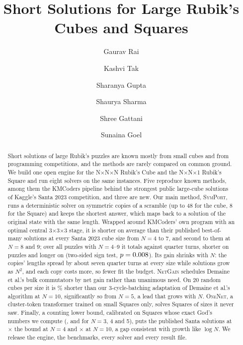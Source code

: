 \documentclass[sigconf,nonacm]{acmart}
\newcommand{\Sq}[1]{#1$\times$#1$\times$1\xspace}
\newcommand{\Cu}[1]{#1$\times$#1$\times$#1\xspace}
\newcommand{\Mname}[1]{\textsc{#1}\xspace}
\newcommand{\FiveA}{\Mname{OneNet}}
\newcommand{\FiveC}{\Mname{NetGain}}
\newcommand{\Mseven}{\Mname{SymPort}}
\begin{document}
\title{Short Solutions for Large Rubik's Cubes and Squares}
\author{Gaurav Rai}
\author{Kashvi Tak}
\author{Sharanya Gupta}
\author{Shaurya Sharma}
\author{Shree Gattani}
\author{Sunaina Goel}

\begin{abstract}
Short solutions of large Rubik's puzzles are known mostly from small cubes and from programming competitions, and the methods
are rarely compared on common ground. We build one open engine for the \Cu{N} Rubik's Cube and the \Sq{N} Rubik's Square and
run eight solvers on the same instances. Five reproduce known methods, among them the KMCoders pipeline behind the strongest
public large-cube solutions of Kaggle's Santa 2023 competition, and three are new. Our main method, \Mseven, runs a deterministic
solver on symmetric copies of a scramble (up to 48 for the cube, 8 for the Square) and keeps the shortest answer, which maps back
to a solution of the original state with the same length. Wrapped around KMCoders' own program with an optimal central
3$\times$3$\times$3 stage, it is shorter on average than their published best-of-many solutions at every Santa 2023 cube size
from $N=4$ to 7, and second to them at $N=8$ and 9; over all \MsevenAllPuzzles{} puzzles with $N=4$--9 it totals
\MsevenAllTotal{} against \MsevenAllPubTotal{} quarter turns, shorter on \MsevenAllWins{} puzzles and longer on
\MsevenAllLosses{} (two-sided sign test, $p=0.008$). Its gain shrinks with $N$: the copies' lengths spread by about
seven quarter turns at every size while solutions grow as $N^2$, and each copy costs more, so fewer fit the budget. \FiveC
schedules Demaine et al.'s bulk commutators by net gain rather than unanimous need. On 20 random cubes per size it is \FiveCCiGainTen\%
shorter than our 3-cycle-batching adaptation of Demaine et al.'s algorithm at $N=10$, significantly so from $N=5$, a lead that
grows with $N$. \FiveA, a cluster-token transformer trained on small Squares
only, solves Squares of sizes it never saw. Finally, a counting lower bound, calibrated on Squares whose exact God's numbers we
compute (\GodSquareThree, \GodSquareFour{} and \GodSquareFive{} for $N=3$, 4 and 5), puts the published Santa solutions at
\PubOverBoundFour{}$\times$ the bound at $N=4$ and \PubOverBoundTen{}$\times$ at $N=10$, a gap consistent with growth like $\log N$. We
release the engine, the benchmarks, every solver and every result file.
\end{abstract}
\end{document}
